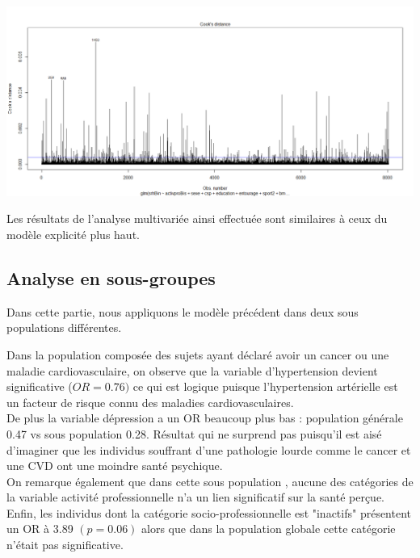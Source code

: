 \documentclass{book}
\begin{document}
\includegraphics[scale=.4]{cooks_distance.png}

Les résultats de l'analyse multivariée ainsi effectuée sont similaires à ceux du modèle explicité plus haut.\\

\subsection{Analyse en sous-groupes}

\noindent
Dans cette partie, nous appliquons le modèle précédent dans deux sous populations différentes.\\

\bigskip

\noindent
Dans la population composée des sujets ayant déclaré avoir un cancer ou une maladie cardiovasculaire, on observe que la variable d'hypertension devient significative ($OR = 0.76)$ ce qui est logique puisque l'hypertension artérielle est un facteur de risque connu des maladies cardiovasculaires.\\

\noindent
De plus la variable dépression a un OR beaucoup plus bas : population générale 0.47 vs sous population 0.28. Résultat qui ne surprend pas puisqu'il est aisé d'imaginer que les individus souffrant d'une pathologie lourde comme le cancer et une CVD ont une moindre santé psychique.\\

\noindent
On remarque également que dans cette sous population , aucune des catégories de la variable activité professionnelle n'a un lien significatif sur la santé perçue.\\

\noindent
Enfin, les individus dont la catégorie socio-professionnelle est "inactifs" présentent un OR à 3.89 $(p = 0.06)$ alors que dans la population globale cette catégorie n'était pas significative.\\
\end{document}
